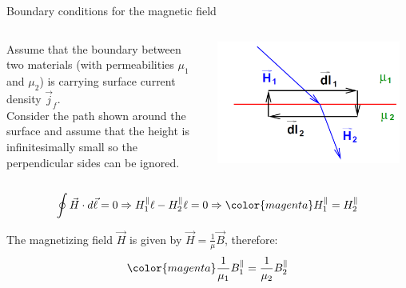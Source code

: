 \begin{frame}{Boundary conditions for the magnetic field}

\begin{columns}
  \begin{column}{0.50\textwidth}
   {\small
     Assume that the boundary between two materials (with
     permeabilities $\mu_1$ and  $\mu_2$)
     is carrying surface current density $\vec{j}_f$.\\
     Consider the path shown around the surface and
     assume that the height is infinitesimally small so the perpendicular
     sides can be ignored.
  }
  \end{column}
  \begin{column}{0.50\textwidth}
    \begin{center}
      \includegraphics[width=0.95\textwidth]{./images/schematics/boundary_conditions_magnetic_field_2.png}\\
    \end{center}
  \end{column}
\end{columns}

\begin{equation*}
  \oint \vec{H} \cdot d\vec{\ell} = 0 \Rightarrow
       H_1^{\parallel} \ell - H_2^{\parallel} \ell = 0 \Rightarrow
        {\color{magenta} H_1^{\parallel} = H_2^{\parallel}}
\end{equation*}

The magnetizing field $\vec{H}$ is given by
$\displaystyle \vec{H} = \frac{1}{\mu} \vec{B}$,
therefore:
\begin{equation*}
        {\color{magenta} \frac{1}{\mu_1}  B_1^{\parallel} = \frac{1}{\mu_2} B_2^{\parallel}}
\end{equation*}

\end{frame}


